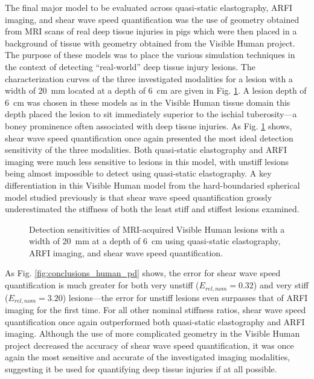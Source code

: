 			The final major model to be evaluated across quasi-static elastography, ARFI imaging, and shear wave speed quantification was the use of geometry obtained from MRI scans of real deep tissue injuries in pigs which were then placed in a background of tissue with geometry obtained from the Visible Human project. The purpose of these models was to place the various simulation techniques in the context of detecting ``real-world'' deep tissue injury lesions. The characterization curves of the three investigated modalities for a lesion with a width of \SI{20}{\mm} located at a depth of \SI{6}{\cm} are given in Fig. \ref{fig:conclusion_human}. A lesion depth of \SI{6}{\cm} was chosen in these models as in the Visible Human tissue domain this depth placed the lesion to sit immediately superior to the ischial tuberosity---a boney prominence often associated with deep tissue injuries. As Fig. \ref{fig:conclusion_human} shows, shear wave speed quantification once again presented the most ideal detection sensitivity of the three modalities. Both quasi-static elastography and ARFI imaging were much less sensitive to lesions in this model, with unstiff lesions being almost impossible to detect using quasi-static elastography. A key differentiation in this Visible Human model from the hard-boundaried spherical model studied previously is that shear wave speed quantification grossly underestimated the stiffness of both the least stiff and stiffest lesions examined.

			\begin{figure}[!htb]
				\centering
				\caption[Detection sensitivities of MRI-acquired Visible Human lesions using the three investigated imaging modalities]{Detection sensitivities of MRI-acquired Visible Human lesions with a width of \SI{20}{\mm} at a depth of \SI{6}{\cm} using quasi-static elastography, ARFI imaging, and shear wave speed quantification.}
				\label{fig:conclusion_human}
			\end{figure}

			As Fig. \ref{fig:conclusions_human_pd} shows, the error for shear wave speed quantification is much greater for both very unstiff ($E_{rel,nom} = 0.32$) and very stiff ($E_{rel,nom} = 3.20$) lesions---the error for unstiff lesions even surpasses that of ARFI imaging for the first time. For all other nominal stiffness ratios, shear wave speed quantification once again outperformed both quasi-static elastography and ARFI imaging. Although the use of more complicated geometry in the Visible Human project decreased the accuracy of shear wave speed quantification, it was once again the most sensitive and accurate of the investigated imaging modalities, suggesting it be used for quantifying deep tissue injuries if at all possible.

